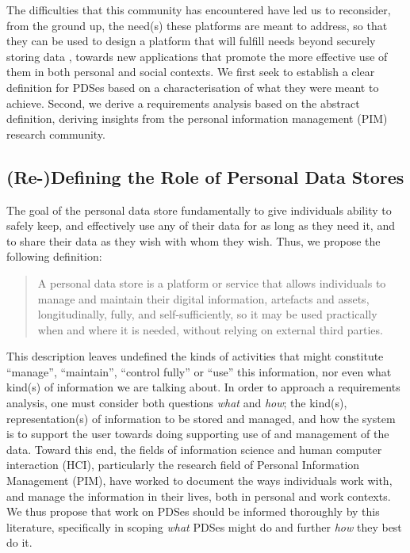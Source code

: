 \documentclass[runningheads,a4paper]{llncs}
\begin{document}
The difficulties that this community has encountered have led us to reconsider, from the ground up, the need(s) these platforms are meant to address, so that they can be used to design a platform that will fulfill needs beyond securely storing data , towards new applications that promote the more effective use of them in both personal and social contexts.  We first seek to establish a clear definition for PDSes based on a characterisation of what they were meant to achieve.  Second, we derive a requirements analysis based on the abstract definition, deriving insights from the personal information management (PIM) research community.

\subsection{(Re-)Defining the Role of Personal Data Stores}


The goal of the personal data store fundamentally to give individuals ability to safely keep, and effectively use any of their data for as long as they need it, and to share their data as they wish with whom they wish. Thus, we propose the following definition:

\begin{quote}

	A personal data store is a platform or service that allows individuals to manage and maintain their digital information, artefacts and assets, longitudinally, fully, and self-sufficiently, so it may be used practically when and where it is needed, without relying on external third parties. 

\end{quote}

This description leaves undefined the kinds of activities that might constitute ``manage'', ``maintain'', ``control fully'' or ``use'' this information, nor even what kind(s) of information we are talking about.  In order to approach a requirements analysis, one must consider both questions \emph{what} and \emph{how}; the kind(s), representation(s) of information to be stored and managed, and how the system is to support the user towards doing supporting use of and management of the data.  Toward this end, the fields of information science and human computer interaction (HCI), particularly the research field of Personal Information Management (PIM), have worked to document the ways individuals work with, and manage the information in their lives, both in personal and work contexts.  We thus propose that work on PDSes should be informed thoroughly by this literature, specifically in scoping \emph{what} PDSes might do and further \emph{how} they best do it.
\end{document}
